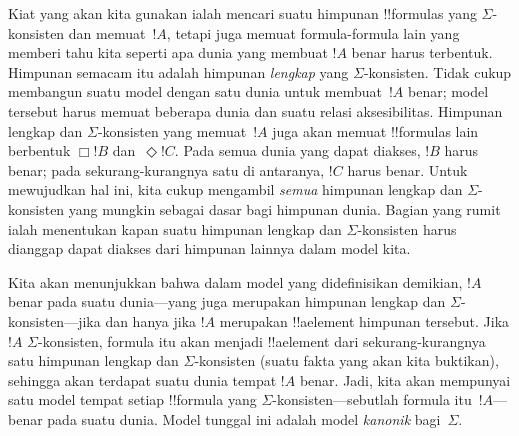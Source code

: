 \documentclass[../../../include/open-logic-section]{subfiles}
\begin{document}
Kiat yang akan kita gunakan ialah mencari suatu himpunan !!{formula}s yang
$\Sigma$-konsisten dan memuat~$!A$, tetapi juga memuat formula-formula lain
yang memberi tahu kita seperti apa dunia yang membuat $!A$ benar harus
terbentuk. Himpunan semacam itu adalah himpunan \emph{lengkap} yang
$\Sigma$-konsisten. Tidak cukup membangun suatu model dengan satu dunia untuk
membuat~$!A$ benar; model tersebut harus memuat beberapa dunia dan suatu
relasi aksesibilitas. Himpunan lengkap dan $\Sigma$-konsisten yang
memuat~$!A$ juga akan memuat !!{formula}s lain berbentuk $\Box !B$
dan~$\Diamond !C$. Pada semua dunia yang dapat diakses, $!B$ harus benar; pada
sekurang-kurangnya satu di antaranya, $!C$ harus benar. Untuk mewujudkan hal
ini, kita cukup mengambil \emph{semua} himpunan lengkap dan $\Sigma$-konsisten
yang mungkin sebagai dasar bagi himpunan dunia. Bagian yang rumit ialah
menentukan kapan suatu himpunan lengkap dan $\Sigma$-konsisten harus dianggap
dapat diakses dari himpunan lainnya dalam model kita.

Kita akan menunjukkan bahwa dalam model yang didefinisikan demikian, $!A$
benar pada suatu dunia---yang juga merupakan himpunan lengkap dan
$\Sigma$-konsisten---jika dan hanya jika $!A$ merupakan !!a{element} himpunan
tersebut. Jika $!A$ $\Sigma$-konsisten, formula itu akan menjadi !!a{element}
dari sekurang-kurangnya satu himpunan lengkap dan $\Sigma$-konsisten (suatu
fakta yang akan kita buktikan), sehingga akan terdapat suatu dunia tempat
$!A$ benar. Jadi, kita akan mempunyai satu model tempat setiap !!{formula}
yang $\Sigma$-konsisten---sebutlah formula itu~$!A$---benar pada suatu dunia.
Model tunggal ini adalah model \emph{kanonik} bagi~$\Sigma$.
\end{document}
